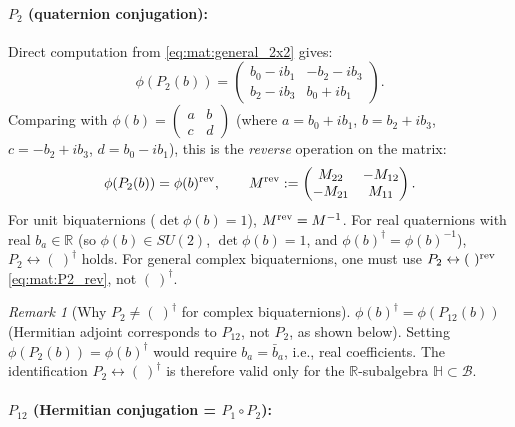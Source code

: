 \documentclass[12pt,a4paper]{article}
\theoremstyle{definition}
\theoremstyle{remark}
\newtheorem{remark}[theorem]{Remark}
\begin{document}
\paragraph{$P_2$ (quaternion conjugation):}

Direct computation from \eqref{eq:mat:general_2x2} gives:
\begin{equation}
  \phi(P_2(b))
  = \begin{pmatrix} b_0 - ib_1 & -b_2 - ib_3 \\ b_2 - ib_3 & b_0 + ib_1 \end{pmatrix}.
  \label{eq:mat:P2_matrix}
\end{equation}
Comparing with $\phi(b) = \begin{pmatrix}a & b \\ c & d\end{pmatrix}$
(where $a = b_0+ib_1$, $b = b_2+ib_3$, $c = -b_2+ib_3$, $d = b_0-ib_1$),
this is the \emph{reverse} operation on the matrix:
\begin{equation}
  \phi(P_2(b)) = \phi(b)^{\rm rev},
  \qquad
  M^{\rm rev} := \begin{pmatrix} M_{22} & -M_{12} \\ -M_{21} & M_{11} \end{pmatrix}.
  \label{eq:mat:P2_rev}
\end{equation}
For unit biquaternions ($\det\phi(b) = 1$), $M^{\rm rev} = M^{-1}$.
For real quaternions with real $b_a\in\mathbb{R}$ (so $\phi(b)\in SU(2)$,
$\det\phi(b)=1$, and $\phi(b)^\dagger = \phi(b)^{-1}$), $P_2 \leftrightarrow (\ )^\dagger$
holds.  For general complex biquaternions, one must use
$P_2 \leftrightarrow (\ )^{\rm rev}$ \eqref{eq:mat:P2_rev}, not $(\ )^\dagger$.

\begin{remark}[Why $P_2\neq(\ )^\dagger$ for complex biquaternions]
$\phi(b)^\dagger = \phi(P_{12}(b))$ (Hermitian adjoint corresponds to $P_{12}$,
not $P_2$, as shown below).
Setting $\phi(P_2(b)) = \phi(b)^\dagger$ would require $b_a = \bar b_a$, i.e.,
real coefficients.  The identification $P_2\leftrightarrow(\ )^\dagger$ is
therefore valid only for the $\mathbb{R}$-subalgebra $\mathbb{H}\subset\mathcal{B}$.
\end{remark}

\paragraph{$P_{12}$ (Hermitian conjugation = $P_1\circ P_2$):}
\end{document}
